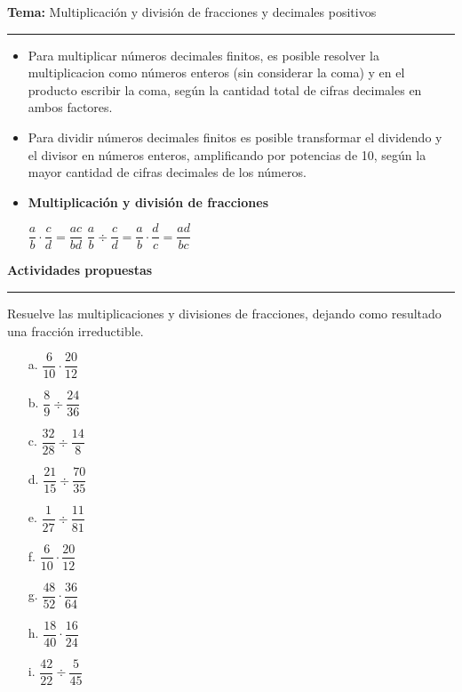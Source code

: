 \documentclass[spanish,letterpaper, 11pt, addpoints, answers]{exam}
\begin{document}
\begin{questions}
\newpage
  \vspace{0.1in}
  \parbox{6in}{
  \textbf{Tema:} Multiplicación y división de fracciones y decimales positivos}
  \vspace{0.15in}
  \hrule 
  
  \begin{itemize}
    \item Para multiplicar números decimales finitos, es posible resolver la multiplicacion como números enteros (sin considerar la coma) y en el producto escribir la coma, según la cantidad total de cifras decimales en ambos factores.
  
    \item Para dividir números decimales finitos es posible transformar el dividendo y el divisor en números enteros, amplificando por potencias de 10, según la mayor cantidad de cifras decimales de los números.

    \item \textbf{Multiplicación y división de fracciones}
\begin{center}
$\dfrac{a}{b}\cdot\dfrac{c}{d}=\dfrac{ac}{bd}$ \hspace{2cm} $\dfrac{a}{b}\div\dfrac{c}{d}=\dfrac{a}{b}\cdot\dfrac{d}{c}=\dfrac{ad}{bc}$

\end{center}

    
  \end{itemize}
  
  \parbox{6in}{
  \textbf{Actividades propuestas}}
  \vspace{0.15in}
  \hrule 

  \question Resuelve las multiplicaciones y divisiones de fracciones, dejando como resultado una fracción irreductible.

  \begin{multicols}{3}
    
 
  \begin{itemize}
    \item[a.] $\dfrac{6}{10}\cdot\dfrac{20}{12}$
    \item[b.] $\dfrac{8}{9}\div\dfrac{24}{36}$
    \item[c.] $\dfrac{32}{28}\div\dfrac{14}{8}$
    \item[d.] $\dfrac{21}{15}\div\dfrac{70}{35}$
    \item[e.] $\dfrac{1}{27}\div\dfrac{11}{81}$
    \item[f.] $\dfrac{6}{10}\cdot\dfrac{20}{12}$
    \item[g.] $\dfrac{48}{52}\cdot\dfrac{36}{64}$
    \item[h.] $\dfrac{18}{40}\cdot\dfrac{16}{24}$
    \item[i.] $\dfrac{42}{22}\div\dfrac{5}{45}$  
  \end{itemize}
 \end{multicols}


\end{questions}
\end{document}
